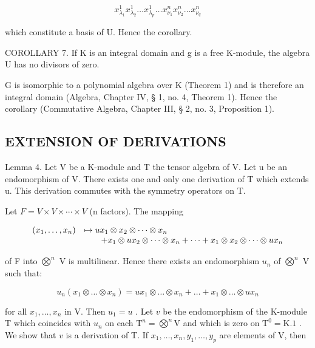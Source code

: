 \[
x _ {\lambda_ {1}} ^ {1} x _ {\lambda_ {2}} ^ {1} \dots x _ {\lambda_ {p}} ^ {1} \dots x _ {\nu_ {1}} ^ {n} x _ {\nu_ {2}} ^ {n} \dots x _ {\nu_ {q}} ^ {n}
\]

which constitute a basis of U. Hence the corollary.

COROLLARY 7. If K is an integral domain and g is a free K-module, the algebra U has no divisors of zero.

G is isomorphic to a polynomial algebra over K (Theorem 1) and is therefore an integral domain (Algebra, Chapter IV, § 1, no. 4, Theorem 1). Hence the corollary (Commutative Algebra, Chapter III, § 2, no. 3, Proposition 1).

\subsection{EXTENSION OF DERIVATIONS}

Lemma 4. Let V be a K-module and T the tensor algebra of V. Let u be an endomorphism of V. There exists one and only one derivation of T which extends u. This derivation commutes with the symmetry operators on T.

Let \(F = V \times V \times \cdots \times V\) (n factors). The mapping

\[
\begin{array}{r l} (x _ {1}, \ldots , x _ {n}) & \mapsto u x _ {1} \otimes x _ {2} \otimes \dots \otimes x _ {n} \\ & \qquad + x _ {1} \otimes u x _ {2} \otimes \dots \otimes x _ {n} + \dots + x _ {1} \otimes x _ {2} \otimes \dots \otimes u x _ {n} \end{array}
\]

of F into \(\bigotimes^{n}\) V is multilinear. Hence there exists an endomorphism \(u_{n}\) of \(\bigotimes^{n}\) V such that:

\[
u _ {n} \left(x _ {1} \otimes \dots \otimes x _ {n}\right) = u x _ {1} \otimes \dots \otimes x _ {n} + \dots + x _ {1} \otimes \dots \otimes u x _ {n}
\]

for all \(x_1, \ldots, x_n\) in V. Then \(u_1 = u\) . Let \(v\) be the endomorphism of the K-module T which coincides with \(u_n\) on each \(\mathrm{T}^n = \bigotimes^n \mathrm{V}\) and which is zero on \(\mathrm{T}^0 = \mathrm{K}. 1\) . We show that \(v\) is a derivation of T. If \(x_1, \ldots, x_n, y_1, \ldots, y_p\) are elements of V, then

